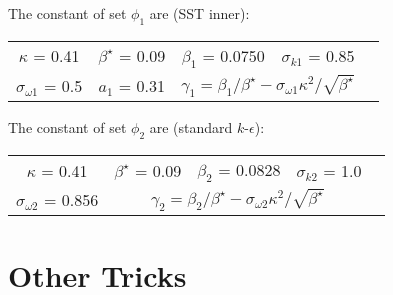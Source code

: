 The constant of set $\phi_{1}$ are (SST inner):
\begin{table}[H]
\centering
	\begin{tabular}{ccccc}
	$\kappa$ = 0.41 & $\beta^{\star}$ = 0.09 & $\beta_{1}$ = 0.0750 & $\sigma_{k1}$ = 0.85 \\ 
	$\sigma_{\omega 1}$ = 0.5 & $a_{1}$ = 0.31 &  \multicolumn{2}{c}{$\gamma_{1}=\beta_{1}/\beta^{\star}-\sigma_{\omega 1}\kappa^{2}/\sqrt{\beta^{\star}}$} \\
	\end{tabular}
\end{table}
\noindent
The constant of set $\phi_{2}$ are (standard $k$-$\epsilon$):
\begin{table}[H]
\centering
	\begin{tabular}{ccccc}
	$\kappa$ = 0.41 & $\beta^{\star}$ = 0.09 & $\beta_{2}$ = 0.0828 & $\sigma_{k2}$ = 1.0 \\ 
	$\sigma_{\omega 2}$ = 0.856 &  \multicolumn{3}{c}{$\gamma_{2}=\beta_{2}/\beta^{\star}-\sigma_{\omega 2}\kappa^{2}/\sqrt{\beta^{\star}}$} \\
	\end{tabular}
\end{table}

\chapter{Other Tricks}


